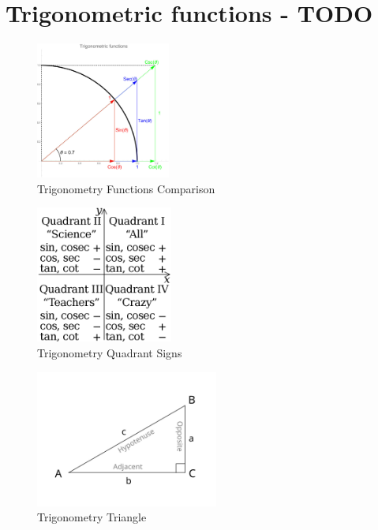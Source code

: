 \section{Trigonometric functions - TODO \cite{wiki-Trigonometric_functions}}\label{Trigonometric_functions}

\begin{table}[H]
    \centering
    \begin{minipage}[t]{0.3\linewidth}
        \begin{figure}[H]
            \centering
            \includegraphics[height=4.5cm]{Pictures/maths/TrigFunctions.jpg}
            \caption{Trigonometry Functions Comparison}
        \end{figure}
    \end{minipage}
    \hfill
    \begin{minipage}[t]{0.3\linewidth}
        \begin{figure}[H]
            \centering
            \includegraphics[height=4.5cm]{Pictures/maths/Trigonometric_function_quadrant_sign.png}
            \caption{Trigonometry Quadrant Signs}
        \end{figure}
    \end{minipage}
    \begin{minipage}[t]{0.3\linewidth}
        \begin{figure}[H]
            \centering
            \includegraphics[height=4.5cm]{Pictures/maths/TrigonometryTriangle.jpg}
            \caption{Trigonometry Triangle}
        \end{figure}        
    \end{minipage}
\end{table}

